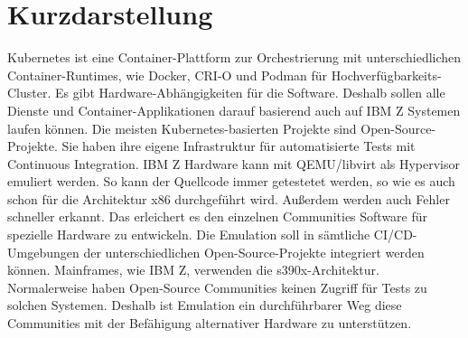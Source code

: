 \thispagestyle{empty}
\section*{Kurzdarstellung}
\label{sec:kurzdarstellung}
Kubernetes ist eine Container-Plattform zur Orchestrierung mit unterschiedlichen Container-Runtimes, wie Docker, CRI-O und Podman für Hochverfügbarkeits-Cluster. Es gibt Hardware-Abhängigkeiten für die Software. Deshalb sollen alle Dienste und Container-Applikationen darauf basierend auch auf IBM Z Systemen laufen können. Die meisten Kubernetes-basierten Projekte sind Open-Source-Projekte. Sie haben ihre eigene Infrastruktur für automatisierte Tests mit Continuous Integration. IBM Z Hardware kann mit QEMU/libvirt als Hypervisor emuliert werden. So kann der Quellcode immer getestetet werden, so wie es auch schon für die Architektur x86 durchgeführt wird. Außerdem werden auch Fehler schneller erkannt. Das erleichert es den einzelnen Communities Software für spezielle Hardware zu entwickeln. Die Emulation soll in sämtliche CI/CD-Umgebungen der unterschiedlichen Open-Source-Projekte integriert werden können. Mainframes, wie IBM Z, verwenden die s390x-Architektur. Normalerweise haben Open-Source Communities keinen Zugriff für Tests zu solchen Systemen. Deshalb ist Emulation ein durchführbarer Weg diese Communities mit der Befähigung alternativer Hardware zu unterstützen.



